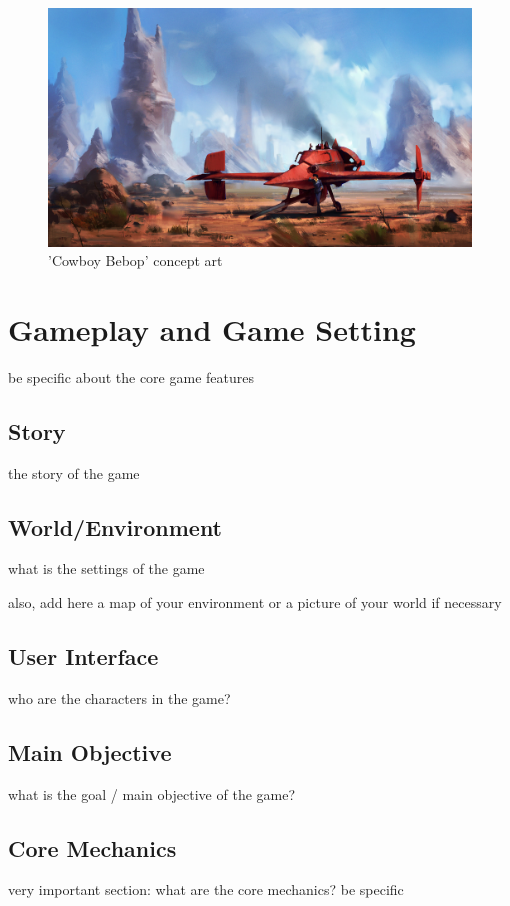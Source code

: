 \documentclass[a4paper]{scrreprt}
\begin{document}
\begin{figure}
  \centering
  \includegraphics[width=1\textwidth]{Spaceship}
  \caption{'Cowboy Bebop' concept art}
  \end{figure}

\chapter{Gameplay and Game Setting}
be specific about the core game features 

\section{Story}
the story of the game

\section{World/Environment}
what is the settings of the game 

also, add here a map of your environment or a picture of your world if necessary

\section{User Interface}
who are the characters in the game?

\section{Main Objective}
what is the goal / main objective of the game?

\section{Core Mechanics}
very important section: what are the core mechanics? be specific
\end{document}

